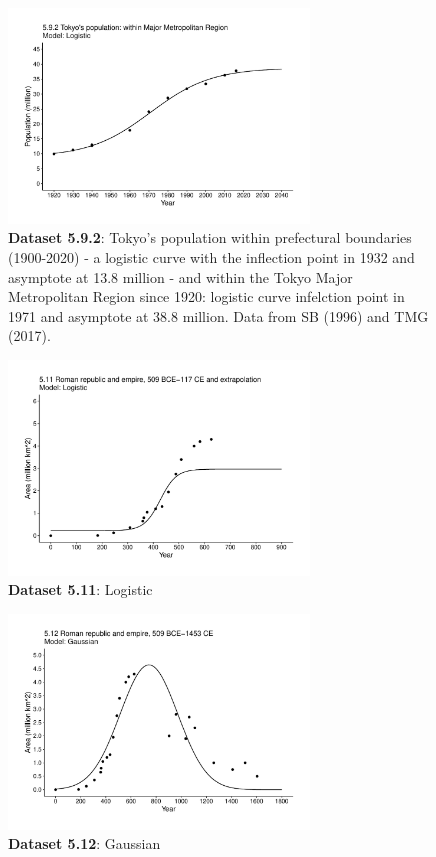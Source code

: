 \documentclass[aps,rmp,preprint,superscriptaddress,10pt,onecolumn]{article}
\begin{document}
\begin{figure}[h]
\includegraphics[width=8cm]{output/figs-ggplot/5.9.2.pdf}
\caption{\textbf{Dataset 5.9.2}: Tokyo's population within prefectural boundaries (1900-2020) - a logistic curve with the inflection point in 1932 and asymptote at 13.8 million - and within the Tokyo Major Metropolitan Region since 1920: logistic curve infelction point in 1971 and asymptote at 38.8 million. Data from SB (1996) and TMG (2017). }
\end{figure}
	
\begin{figure}[h]
\includegraphics[width=8cm]{output/figs-ggplot/5.11.pdf}
\caption{\textbf{Dataset 5.11}: Logistic}
\end{figure}
	
\begin{figure}[h]
\includegraphics[width=8cm]{output/figs-ggplot/5.12.pdf}
\caption{\textbf{Dataset 5.12}: Gaussian}
\end{figure}
	
\end{document}
